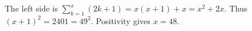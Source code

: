 The left side is $\sum_{k=1}^x(2k+1)=x(x+1)+x=x^2+2x $. Thus $(x+1)^2=2401=49^2 $. Positivity gives $\boxed{x=48}$.
